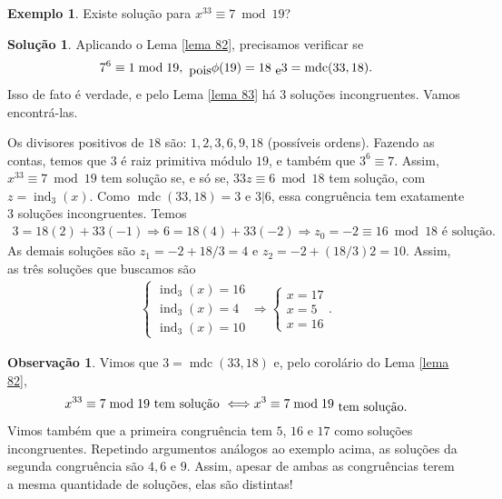 \documentclass[a4paper,11pt,twoside, leqno]{article}
\DeclareMathOperator{\mdc}{mdc}
\DeclareMathOperator{\ind}{ind}
\theoremstyle{definition}
\newtheorem{remark}{Observação}[section]
\newtheorem*{example}{Exemplo}
\newtheorem*{solution}{Solução}
\begin{document}
\begin{example}
	Existe solução para $x^{33}\equiv 7\bmod 19$?
\end{example}
\begin{solution}
	Aplicando o Lema \eqref{lema 82}, precisamos verificar se
	\begin{align*}
	7^6\equiv 1\bmod 19, \txt{ pois } \phi(19) = 18 \txt{ e } 3 = \mdc(33,18).
	\end{align*}
	Isso de fato é verdade, e pelo Lema \eqref{lema 83} há $3$ soluções incongruentes. Vamos encontrá-las. 
	\par\vspace{0.3cm} Os divisores positivos de $18$ são: $1,2,3,6,9,18$ (possíveis ordens). Fazendo as contas, temos que $3$ é raiz primitiva módulo $19$, e também que $3^6\equiv 7$. Assim, $x^{33}\equiv 7\bmod 19$ tem solução se, e só se, $33z\equiv 6\bmod 18$ tem solução, com $z = \ind_3(x)$. Como $\mdc(33,18) = 3$ e $3|6$, essa congruência tem exatamente $3$ soluções incongruentes. Temos
	\begin{align*}
	3 = 18(2) + 33(-1) \Longrightarrow 6 = 18(4) + 33(-2) \Longrightarrow z_0 = -2\equiv 16\bmod 18 \text{ é solução.}
	\end{align*}
	As demais soluções são $z_1 = -2 + 18/3 = 4$ e $z_2 = -2 + (18/3)2 = 10$. Assim, as três soluções que buscamos são
	\begin{align*}
	\begin{cases}
	\ind_3(x) = 16 \\
	\ind_3(x) = 4 \\
	\ind_3(x) = 10
	\end{cases} \Longrightarrow \begin{cases}
	x = 17 \\
	x = 5 \\
	x = 16
	\end{cases}.
	\end{align*}
\end{solution}
\begin{remark}
	Vimos que $3 = \mdc(33,18)$ e, pelo corolário do Lema \eqref{lema 82},
	\begin{align*}
	x^{33}\equiv 7\bmod 19 \text{ tem solução } \Longleftrightarrow x^3\equiv 7\bmod 19 \txt{ tem solução.}
	\end{align*}
	Vimos também que a primeira congruência tem $5$, $16$ e $17$ como soluções incongruentes. Repetindo argumentos análogos ao exemplo acima, as soluções da segunda congruência são $4, 6$ e $9$. Assim, apesar de ambas as congruências terem a mesma quantidade de soluções, elas são distintas!
\end{remark}
\end{document}
